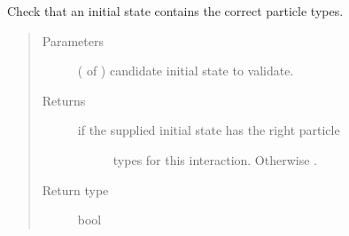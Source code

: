 \documentclass[letterpaper,10pt,english]{sphinxmanual}
\begin{document}
\begin{fulllineitems}
\begin{fulllineitems}
\label{\detokenize{code_structure:scdc.interaction.Interaction.valid_initial}}
Check that an initial state contains the correct particle types.
\begin{quote}\begin{description}
\item[{Parameters}] \leavevmode
{} ( of ) \textendash{} candidate initial
state to validate.

\item[{Returns}] \leavevmode
\begin{description}
\item[{ if the supplied initial state has the right particle}] \leavevmode
types for this interaction. Otherwise .

\end{description}


\item[{Return type}] \leavevmode
bool

\end{description}\end{quote}

\end{fulllineitems}


\end{fulllineitems}

\end{document}
